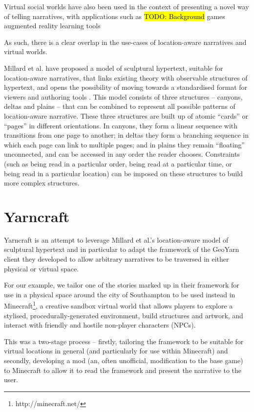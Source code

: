 \documentclass{acm}
\newcommand{\TODO}[1]{\hl{TODO: #1}}
\begin{document}
Virtual social worlds have also been used in the context of presenting a novel way of telling narratives, with applications such as
\TODO{Background}
games
augmented reality
learning tools \cite{avouris2012review}

As such, there is a clear overlap in the use-cases of location-aware narratives and virtual worlds.

Millard et al. have proposed a model of sculptural hypertext, suitable for location-aware narratives, that links existing theory with observable structures of hypertext, and opens the possibility of moving towards a standardised format for viewers and authoring tools \cite{millard13canyons}. This model consists of three structures -- canyons, deltas and plains -- that can be combined to represent all possible patterns of location-aware narrative. These three structures are built up of atomic ``cards'' or ``pages'' in different orientations. In canyons, they form a linear sequence with transitions from one page to another; in deltas they form a branching sequence in which each page can link to multiple pages; and in plains they remain ``floating'' unconnected, and can be accessed in any order the reader chooses. Constraints (such as being read in a particular order, being read at a particular time, or being read in a particular location) can be imposed on these structures to build more complex structures.


\section{Yarncraft}

Yarncraft is an attempt to leverage Millard et al.'s location-aware model of sculptural hypertext and in particular to adapt the framework of the GeoYarn client they developed to allow arbitrary narratives to be traversed in either physical or virtual space.

For our example, we tailor one of the stories marked up in their framework for use in a physical space around the city of Southampton to be used instead in Minecraft\footnote{http://minecraft.net/}, a creative sandbox virtual world that allows players to explore a stylised, procedurally-generated environment, build structures and artwork, and interact with friendly and hostile non-player characters (NPCs).

This was a two-stage process -- firstly, tailoring the framework to be suitable for virtual locations in general (and particularly for use within Minecraft) and secondly, developing a mod (an, often unofficial, modification to the base game) to Minecraft to allow it to read the framework and present the narrative to the user.
\end{document}
